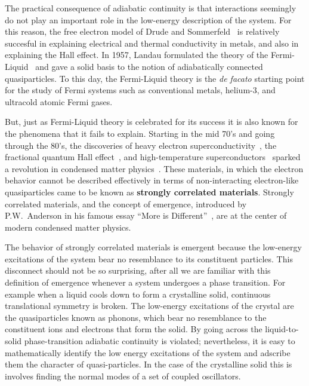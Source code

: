 \documentclass[oneside,11pt]{memoir}
\begin{document}
The practical consequence of adiabatic continuity is that interactions
seemingly do not play an important role in the low-energy description of the
system.  For this reason, the free electron model of Drude and
Sommerfeld~\cite{ashcroft1976solid} is relatively succesful in explaining
electrical and thermal conductivity in metals,  and also in explaining the Hall
effect.   In 1957, Landau formulated the theory of the
Fermi-Liquid~\cite{landau1965collected} and gave a solid basis to the notion of
adiabatically connected quasiparticles.  To this day, the Fermi-Liquid theory
is the \textit{de facato} starting point for the study of Fermi systems such as
conventional metals, helium-3, and ultracold atomic Fermi gases.   

But, just as Fermi-Liquid theory is celebrated for its success it is also known
for the phenomena that it fails to explain.   Starting in the mid 70's and
going through the 80's, the discoveries of heavy electron
superconductivity~\cite{PhysRevLett.35.1779,PhysRevLett.43.1892},  the
fractional quantum Hall effect~\cite{PhysRevLett.48.1559,PhysRevLett.50.1395},
and high-temperature superconductors~\cite{Zeitschrift.64.189} sparked a
revolution in condensed matter physics~\cite{coleman2004revolution}.   These
materials, in which the electron behavior cannot be described effectively in
terms of non-interacting electron-like quasiparticles came to be known as
\textbf{strongly correlated materials}.   Strongly correlated materials, and
the concept of emergence, introduced by P.W.~Anderson in his famous essay
``More is Different''~\cite{Anderson1972}, are at the center of modern
condensed matter physics. 

The behavior of strongly correlated materials is emergent because the
low-energy excitations of the system bear no resemblance to its constituent
particles.  This disconnect should not be so surprising, after all we are
familiar with this definition of emergence whenever a system undergoes a phase
transition.  For example when a liquid cools down to form a crystalline solid,
continuous translational symmetry is broken.    The low-energy excitations of
the crystal are the quasiparticles known as phonons, which bear no resemblance
to the constituent ions and electrons that form the solid.  By going across the
liquid-to-solid phase-transition adiabatic continuity is violated; nevertheless,
it is easy to mathematically identify the low energy excitations of the system
and adscribe them the character of quasi-particles.  In the case of the
crystalline solid this is involves finding the normal modes of a set of coupled
oscillators.  
\end{document}
